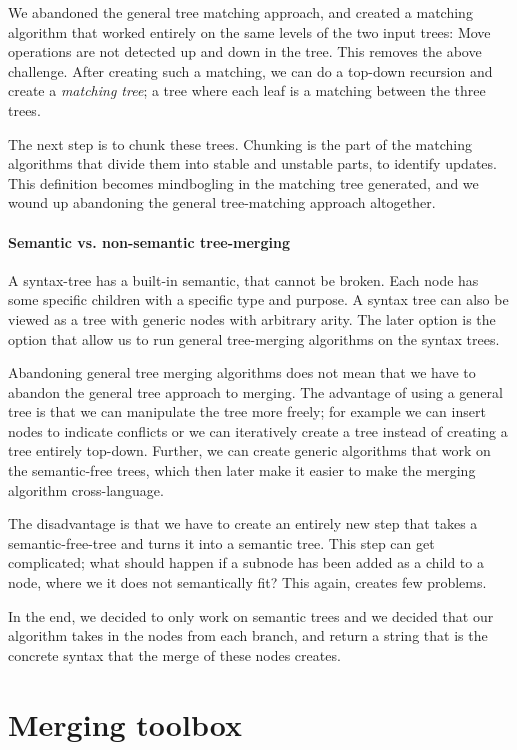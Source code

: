 \documentclass[11pt]{article}
\begin{document}
We abandoned the general tree matching approach, and created a matching algorithm that worked entirely on the same levels of the two input trees: Move operations are not detected up and down in the tree. This removes the above challenge. After creating such a matching, we can do a top-down recursion and create a \textit{matching tree}; a tree where each leaf is a matching between the three trees. 

The next step is to chunk these trees. Chunking is the part of the matching algorithms that divide them into stable and unstable parts, to identify updates. This definition becomes mindbogling in the matching tree generated, and we wound up abandoning the general tree-matching approach altogether.
 
\paragraph{Semantic vs. non-semantic tree-merging} A syntax-tree has a built-in semantic, that cannot be broken. Each node has some specific children with a specific type and purpose. A syntax tree can also be viewed as a tree with generic nodes with arbitrary arity. The later option is the option that allow us to run general tree-merging algorithms on the syntax trees.

Abandoning general tree merging algorithms does not mean that we have to abandon the general tree approach to merging. The advantage of using a general tree is that we can manipulate the tree more freely; for example we can insert nodes to indicate conflicts or we can iteratively create a tree instead of creating a tree entirely top-down. Further, we can create generic algorithms that work on the semantic-free trees, which then later make it easier to make the merging algorithm cross-language.

The disadvantage is that we have to create an entirely new step that takes a semantic-free-tree and turns it into a semantic tree. This step can get complicated; what should happen if a subnode has been added as a child to a node, where we it does not semantically fit? This again, creates few problems.

In the end, we decided to only work on semantic trees and we decided that our algorithm takes in the nodes from each branch, and return a string that is the concrete syntax that the merge of these nodes creates.

\clearpage

\section{Merging toolbox}
\end{document}
